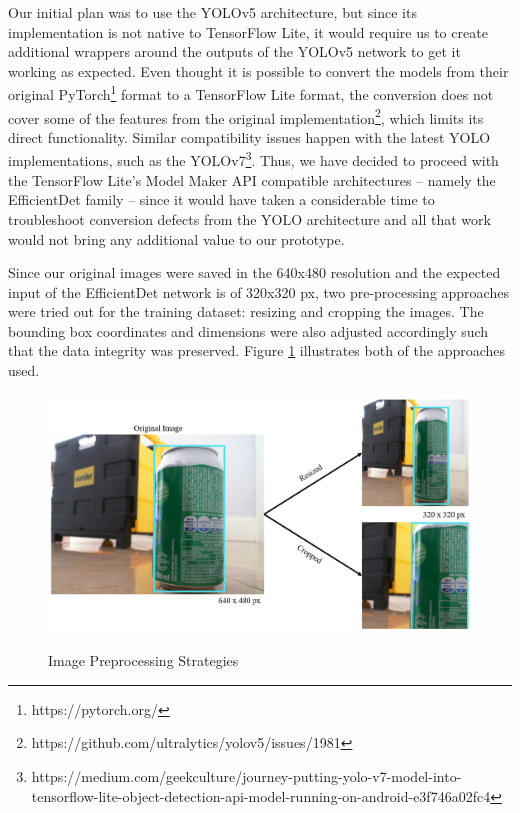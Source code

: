 Our initial plan was to use the YOLOv5 architecture, but since its
implementation is not native to TensorFlow Lite, it would require us to create
additional wrappers around the outputs of the YOLOv5 network to get it working
as expected. Even thought it is possible to convert the models from their
original PyTorch\footnote{https://pytorch.org/} format to a TensorFlow Lite
format, the conversion does not cover some of the features from the original
implementation\footnote{https://github.com/ultralytics/yolov5/issues/1981},
which limits its direct functionality. Similar compatibility issues happen with
the latest YOLO implementations, such as the
YOLOv7\footnote{https://medium.com/geekculture/journey-putting-yolo-v7-model-into-tensorflow-lite-object-detection-api-model-running-on-android-e3f746a02fc4}.
Thus, we have decided to proceed with the TensorFlow Lite's Model Maker API
compatible architectures -- namely the EfficientDet family --  since it would
have taken a considerable time to troubleshoot conversion defects from the YOLO
architecture and all that work would not bring any additional value to our
prototype.

Since our original images were saved in the 640x480 resolution and the expected
input of the EfficientDet network is of 320x320 px, two pre-processing
approaches were tried out for the training dataset: resizing and cropping the
images. The bounding box coordinates and dimensions were also adjusted
accordingly such that the data integrity was preserved. Figure
\ref{fig:preprocess} illustrates both of the approaches used.

\begin{figure}[H]
	\centering
	\caption[Image Preprocessing Strategies]{Image Preprocessing Strategies}
    \includegraphics[width=1\textwidth]{./images/image_preprocessing.png}
	\fonte{}
    \label{fig:preprocess}
\end{figure}

